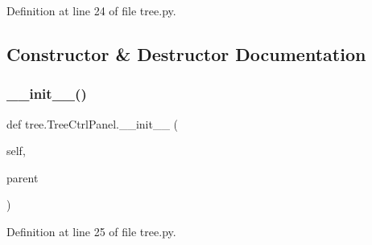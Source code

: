 Definition at line 24 of file tree.\+py.



\subsection{Constructor \& Destructor Documentation}
\mbox{\label{classtree_1_1TreeCtrlPanel_a7186d9554ffd4aaa2b753cea3fb35239}} 
\subsubsection{\texorpdfstring{\+\_\+\+\_\+init\+\_\+\+\_\+()}{\_\_init\_\_()}}
{\footnotesize\ttfamily def tree.\+Tree\+Ctrl\+Panel.\+\_\+\+\_\+init\+\_\+\+\_\+ (\begin{DoxyParamCaption}\item[{}]{self,  }\item[{}]{parent }\end{DoxyParamCaption})}



Definition at line 25 of file tree.\+py.



